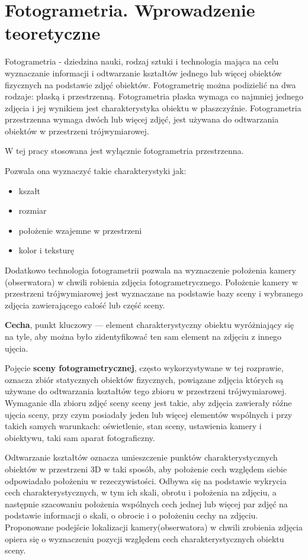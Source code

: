 \graphicspath{ {./img/2_Theory/} }


\chapter{Fotogrametria. Wprowadzenie teoretyczne}

Fotogrametria - dziedzina nauki, rodzaj sztuki i technologia mająca na celu wyznaczanie informacji i odtwarzanie kształtów jednego lub więcej obiektów fizycznych na podstawie zdjęć obiektów.
Fotogrametrię można podizielić na dwa rodzaje: płaską i przestrzenną. Fotogrametria płaska wymaga co najmniej jednego zdjęcia i jej wynikiem jest charakterystyka obiektu w płaszczyźnie. Fotogrametria przestrzenna wymaga dwóch lub więcej zdjęć, jest używana do odtwarzania obiektów w przestrzeni trójwymiarowej.

W tej pracy stosowana jest wyłącznie fotogrametria przestrzenna.

Pozwala ona wyznaczyć takie charakterystyki jak:
\begin{itemize}
   \item kszałt
   \item rozmiar
   \item położenie wzajemne w przestrzeni
   \item kolor i teksturę
\end{itemize}

Dodatkowo technologia fotogrametrii pozwala na wyznaczenie położenia kamery (obserwatora) w chwili robienia zdjęcia fotogrametrycznego.
Położenie kamery w przestrzeni trójwymiarowej jest wyznaczane na podstawie bazy sceny i wybranego zdjęcia zawierającego całość lub część sceny.

\textbf{Cecha}, punkt kluczowy --- element charakterystyczny obiektu wyróżniający się na tyle, aby można było zidentyfikować ten sam element na zdjęciu z innego ujęcia.

Pojęcie \textbf{sceny fotogrametrycznej}, często wykorzystywane w tej rozprawie, oznacza zbiór statycznych obiektów fizycznych, powiązane zdjęcia których są używane do odtwarzania kształtów tego zbioru w przestrzeni trójwymiarowej.
Wymaganie dla zbioru zdjęć sceny sceny jest takie, aby zdjęcia zawierały róźne ujęcia sceny, przy czym posiadały jeden lub więcej elementów wspólnych i przy takich samych warunkach: oświetlenie, stan sceny, ustawienia kamery i obiektywu, taki sam aparat fotograficzny.

Odtwarzanie kształtów oznacza umieszczenie punktów charakterystycznych obiektów w przestrzeni 3D w taki sposób, aby położenie cech względem siebie odpowiadało położeniu w rezeczywistości. Odbywa się na podstawie wykrycia cech charakterystycznych, w tym ich skali, obrotu i położenia na zdjęciu, a następnie szacowaniu położenia wspólnych cech jednej lub więcej par zdjęć na podstawie informacji o skali, o obrocie i o położeniu cechy na zdjęciu.
Proponowane podejście lokalizacji kamery(obserwatora) w chwili zrobienia zdjęcia opiera się o wyznaczeniu pozycji względem cech charakterystycznych obiektu sceny.

